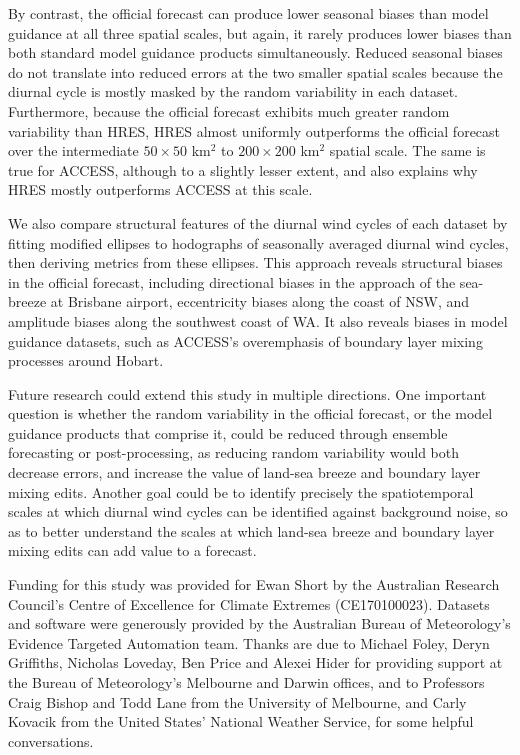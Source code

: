 \documentclass{ametsoc}
\begin{document}
By contrast, the official forecast can produce lower seasonal biases than model guidance at all three spatial scales, but again, it rarely produces lower biases than both standard model guidance products simultaneously. Reduced seasonal biases do not translate into reduced errors at the two smaller spatial scales because the diurnal cycle is mostly masked by the random variability in each dataset. Furthermore, because the official forecast exhibits much greater random variability than HRES, HRES almost uniformly outperforms the official forecast over the intermediate $50\times 50$ km$^{2}$ to $200 \times 200$ km$^{2}$ spatial scale. The same is true for ACCESS, although to a slightly lesser extent, and also explains why HRES mostly outperforms ACCESS at this scale. 

We also compare structural features of the diurnal wind cycles of each dataset by fitting modified ellipses to hodographs of seasonally averaged diurnal wind cycles, then deriving metrics from these ellipses. This approach reveals structural biases in the official forecast, including directional biases in the approach of the sea-breeze at Brisbane airport, eccentricity biases along the coast of NSW, and amplitude biases along the southwest coast of WA. It also reveals biases in model guidance datasets, such as ACCESS's overemphasis of boundary layer mixing processes around Hobart.   

Future research could extend this study in multiple directions. One important question is whether the random variability in the official forecast, or the model guidance products that comprise it, could be reduced through ensemble forecasting or post-processing, as reducing random variability would both decrease errors, and increase the value of land-sea breeze and boundary layer mixing edits. Another goal could be to identify precisely the spatiotemporal scales at which diurnal wind cycles can be identified against background noise, so as to better understand the scales at which land-sea breeze and boundary layer mixing edits can add value to a forecast.  

\acknowledgments
Funding for this study was provided for Ewan Short by the Australian Research Council's Centre of Excellence for Climate Extremes (CE170100023). Datasets and software were generously provided by the Australian Bureau of Meteorology's Evidence Targeted Automation team. Thanks are due to Michael Foley, Deryn Griffiths, Nicholas Loveday, Ben Price and Alexei Hider for providing support at the Bureau of Meteorology's Melbourne and Darwin offices, and to Professors Craig Bishop and Todd Lane from the University of Melbourne, and Carly Kovacik from the United States' National Weather Service, for some helpful conversations.



\end{document}
